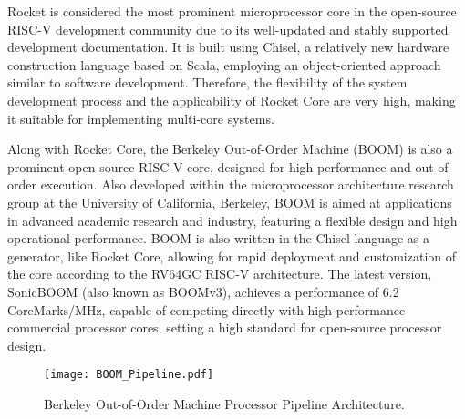 Rocket is considered the most prominent microprocessor core in the open-source RISC-V development community due to its well-updated and stably supported development documentation. It is built using Chisel, a relatively new hardware construction language based on Scala, employing an object-oriented approach similar to software development. Therefore, the flexibility of the system development process and the applicability of Rocket Core are very high, making it suitable for implementing multi-core systems.

Along with Rocket Core, the Berkeley Out-of-Order Machine (BOOM) \cite{celio2015boom, celio2016boom_spec,celio_phdthesis_2018boom} is also a prominent open-source RISC-V core, designed for high performance and out-of-order execution. Also developed within the microprocessor architecture research group at the University of California, Berkeley, BOOM is aimed at applications in advanced academic research and industry, featuring a flexible design and high operational performance. BOOM is also written in the Chisel language as a generator, like Rocket Core, allowing for rapid deployment and customization of the core according to the RV64GC RISC-V architecture. The latest version, SonicBOOM \cite{zhao2020sonicboom} (also known as BOOMv3), achieves a performance of 6.2 CoreMarks/MHz, capable of competing directly with high-performance commercial processor cores, setting a high standard for open-source processor design.

\begin{figure}[h!]
    \centering
    \texttt{[image: BOOM\_Pipeline.pdf]}
    \caption{Berkeley Out-of-Order Machine Processor Pipeline Architecture. \cite{celio_phdthesis_2018boom}}
    \label{fig:boom_architecture}
\end{figure}

